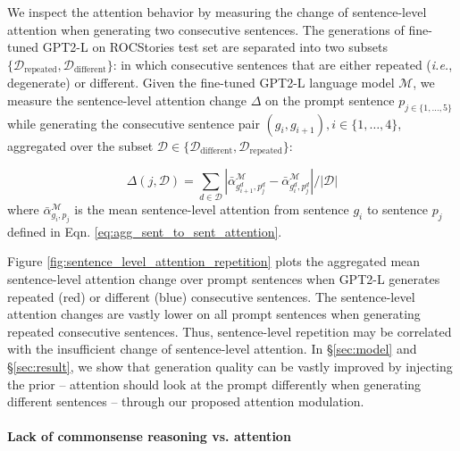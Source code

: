 \documentclass[11pt,a4paper]{article}
\newcommand{\ie}{\textit{i.e.}}
\newcommand{\alg}{attention modulation}
\begin{document}
We inspect the attention behavior by measuring the change of sentence-level attention when generating two consecutive sentences.  %
The generations of fine-tuned GPT2-L on ROCStories test set are separated into two subsets $\{\mathcal{D}_{\text{repeated}},\mathcal{D}_{\text{different}} \}$: in which consecutive sentences that are either repeated (\ie, degenerate) or different. Given the fine-tuned GPT2-L language model $\mathcal{M}$, we measure the sentence-level attention change $\Delta$ on the prompt sentence $p_{j \in \{ 1, \ldots, 5\}}$ while generating the consecutive sentence pair $(g_i, g_{i+1}),i \in \{1,\ldots, 4\}$, aggregated over the subset $\mathcal{D} \in \{\mathcal{D}_{\text{different}},  \mathcal{D}_{\text{repeated}}\}$: 

\begin{equation}
\label{eq:sentence_attention_change}
    \Delta (j,\mathcal{D}) = \sum_{d \in \mathcal{D}}|\bar{\alpha}^{\mathcal{M}}_{g^d_{i+1},p^d_{j}} - \bar{\alpha}^{\mathcal{M}}_{g^d_{i},p^d_{j}}|/|\mathcal{D}|
\end{equation}
where $\bar{\alpha}^{\mathcal{M}}_{g_{i},p_{j}}$ is the mean sentence-level attention from sentence $g_{i}$ to sentence $p_{j}$ defined in Eqn. \ref{eq:agg_sent_to_sent_attention}.

Figure \ref{fig:sentence_level_attention_repetition} plots the aggregated mean sentence-level attention change over prompt sentences when GPT2-L generates repeated (red) or different (blue) consecutive sentences. The sentence-level attention changes are vastly lower on all prompt sentences when generating repeated consecutive sentences. %
Thus, sentence-level repetition may be correlated with the insufficient change of sentence-level attention. In \S \ref{sec:model} and \S \ref{sec:result}, we show that generation quality can be vastly improved by injecting the prior -- attention should look at the prompt differently when generating different sentences -- through our proposed \alg{}.

\paragraph{Lack of commonsense reasoning vs. attention}
\end{document}
